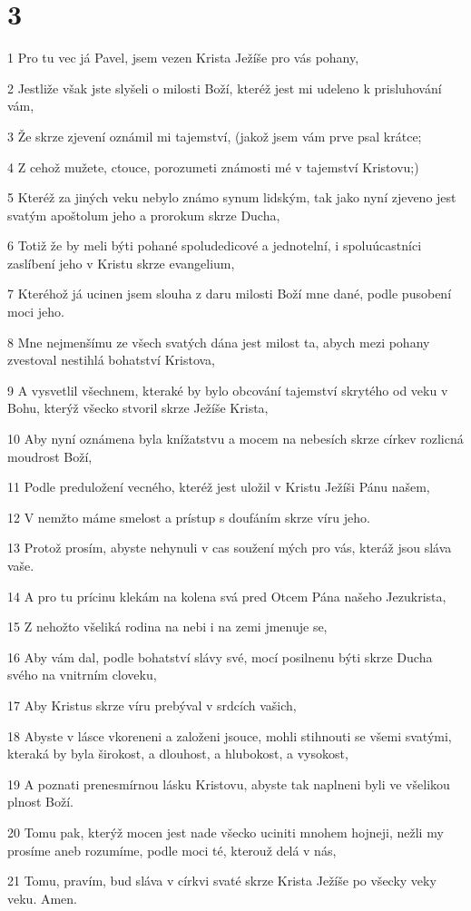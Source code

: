 \chapter{3}

\par 1 Pro tu vec já Pavel, jsem vezen Krista Ježíše pro vás pohany,
\par 2 Jestliže však jste slyšeli o milosti Boží, kteréž jest mi udeleno k prisluhování vám,
\par 3 Že skrze zjevení oznámil mi tajemství, (jakož jsem vám prve psal krátce;
\par 4 Z cehož mužete, ctouce, porozumeti známosti mé v tajemství Kristovu;)
\par 5 Kteréž za jiných veku nebylo známo synum lidským, tak jako nyní zjeveno jest svatým apoštolum jeho a prorokum skrze Ducha,
\par 6 Totiž že by meli býti pohané spoludedicové a jednotelní, i spoluúcastníci zaslíbení jeho v Kristu skrze evangelium,
\par 7 Kteréhož já ucinen jsem slouha z daru milosti Boží mne dané, podle pusobení moci jeho.
\par 8 Mne nejmenšímu ze všech svatých dána jest milost ta, abych mezi pohany zvestoval nestihlá bohatství Kristova,
\par 9 A vysvetlil všechnem, kteraké by bylo obcování tajemství skrytého od veku v Bohu, kterýž všecko stvoril skrze Ježíše Krista,
\par 10 Aby nyní oznámena byla knížatstvu a mocem na nebesích skrze církev rozlicná moudrost Boží,
\par 11 Podle preduložení vecného, kteréž jest uložil v Kristu Ježíši Pánu našem,
\par 12 V nemžto máme smelost a prístup s doufáním skrze víru jeho.
\par 13 Protož prosím, abyste nehynuli v cas soužení mých pro vás, kteráž jsou sláva vaše.
\par 14 A pro tu prícinu klekám na kolena svá pred Otcem Pána našeho Jezukrista,
\par 15 Z nehožto všeliká rodina na nebi i na zemi jmenuje se,
\par 16 Aby vám dal, podle bohatství slávy své, mocí posilnenu býti skrze Ducha svého na vnitrním cloveku,
\par 17 Aby Kristus skrze víru prebýval v srdcích vašich,
\par 18 Abyste v lásce vkoreneni a založeni jsouce, mohli stihnouti se všemi svatými, kteraká by byla širokost, a dlouhost, a hlubokost, a vysokost,
\par 19 A poznati prenesmírnou lásku Kristovu, abyste tak naplneni byli ve všelikou plnost Boží.
\par 20 Tomu pak, kterýž mocen jest nade všecko uciniti mnohem hojneji, nežli my prosíme aneb rozumíme, podle moci té, kterouž delá v nás,
\par 21 Tomu, pravím, bud sláva v církvi svaté skrze Krista Ježíše po všecky veky veku. Amen.

